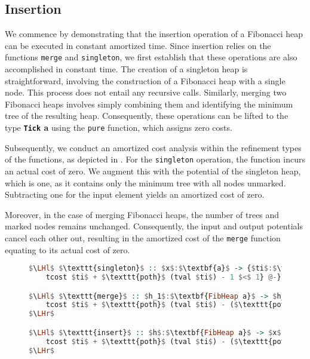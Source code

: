 \documentclass{clmthesis}
\begin{document}
\subsection{Insertion}
We commence by demonstrating that the insertion operation of a Fibonacci heap can be executed in constant amortized time. Since insertion relies on the functions \texttt{merge} and \texttt{singleton}, we first establish that these operations are also accomplished in constant time. The creation of a singleton heap is straightforward, involving the construction of a Fibonacci heap with a single node. This process does not entail any recursive calls. Similarly, merging two Fibonacci heaps involves simply combining them and identifying the minimum tree of the resulting heap. Consequently, these operations can be lifted to the type \textbf{\lstinline{Tick} a} using the \texttt{pure} function, which assigns zero costs.

Subsequently, we conduct an amortized cost analysis within the refinement types of the functions, as depicted in . For the \texttt{singleton} operation, the function incurs an actual cost of zero. We augment this with the potential of the singleton heap, which is one, as it contains only the minimum tree with all nodes unmarked. Subtracting one for the input element yields an amortized cost of zero.

Moreover, in the case of merging Fibonacci heaps, the number of trees and marked nodes remains unchanged. Consequently, the input and output potentials cancel each other out, resulting in the amortized cost of the \texttt{merge} function equating to its actual cost of zero.

\begin{figure}[h]
\begin{lstlisting}[mathescape=true, language=haskell, caption={Amortized cost analysis of \texttt{singleton}, \texttt{merge} and \texttt{insert}.},captionpos=b, label=fig:FmergePot]
$\LHl$ $\texttt{singleton}$ :: $x$:$\textbf{a}$ -> {$ti$:$\textbf{Tick NEFibHeap}$ |
	tcost $ti$ + $\texttt{poth}$ (tval $ti$) - 1 $<$ 1} @-}

$\LHl$ $\texttt{merge}$ :: $h_1$:$\textbf{FibHeap a}$ -> $h_2$:$\textbf{NEFibHeap}$	-> {$ti$:$\textbf{Tick NEFibHeap}$ | 
	tcost $ti$ + $\texttt{poth}$ (tval $ti$) - ($\texttt{poth}$ $h_1$ + $\texttt{poth}$ $h_2$) $< 1$} 
$\LHr$

$\LHl$ $\texttt{insert}$ :: $h$:$\textbf{FibHeap a}$ -> $x$:$\textbf{a}$ -> {$ti$:$\textbf{Tick NEFibHeap}$ | 
	tcost $ti$ + $\texttt{poth}$ (tval $ti$) - ($\texttt{poth}$ $h$ + 1) $< 1$} 
$\LHr$
\end{lstlisting}
\end{figure}
\end{document}
